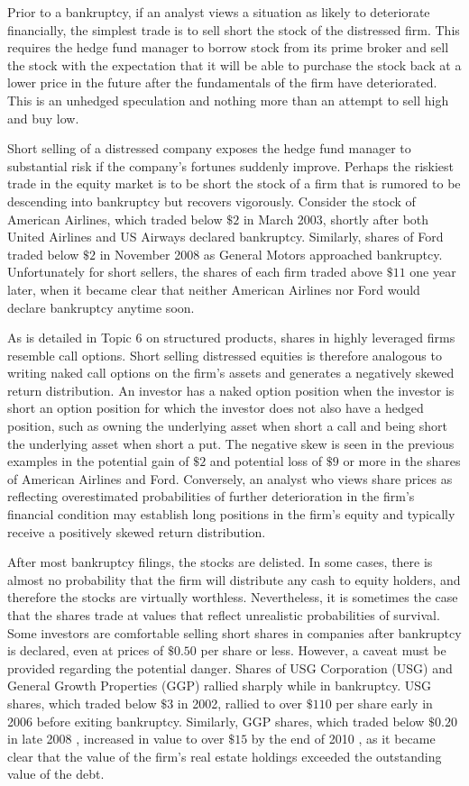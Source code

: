 \documentclass[11pt]{article}
\begin{document}
Prior to a bankruptcy, if an analyst views a situation as likely to deteriorate financially, the simplest trade is to sell short the stock of the distressed firm. This requires the hedge fund manager to borrow stock from its prime broker and sell the stock with the expectation that it will be able to purchase the stock back at a lower price in the future after the fundamentals of the firm have deteriorated. This is an unhedged speculation and nothing more than an attempt to sell high and buy low.

Short selling of a distressed company exposes the hedge fund manager to substantial risk if the company's fortunes suddenly improve. Perhaps the riskiest trade in the equity market is to be short the stock of a firm that is rumored to be descending into bankruptcy but recovers vigorously. Consider the stock of American Airlines, which traded below $\$ 2$ in March 2003, shortly after both United Airlines and US Airways declared bankruptcy. Similarly, shares of Ford traded below $\$ 2$ in November 2008 as General Motors approached bankruptcy. Unfortunately for short sellers, the shares of each firm traded above $\$ 11$ one year later, when it became clear that neither American Airlines nor Ford would declare bankruptcy anytime soon.

As is detailed in Topic 6 on structured products, shares in highly leveraged firms resemble call options. Short selling distressed equities is therefore analogous to writing naked call options on the firm's assets and generates a negatively skewed return distribution. An investor has a naked option position when the investor is short an option position for which the investor does not also have a hedged position, such as owning the underlying asset when short a call and being short the underlying asset when short a put. The negative skew is seen in the previous examples in the potential gain of $\$ 2$ and potential loss of $\$ 9$ or more in the shares of American Airlines and Ford. Conversely, an analyst who views share prices as reflecting overestimated probabilities of further deterioration in the firm's financial condition may establish long positions in the firm's equity and typically receive a positively skewed return distribution.

After most bankruptcy filings, the stocks are delisted. In some cases, there is almost no probability that the firm will distribute any cash to equity holders, and therefore the stocks are virtually worthless. Nevertheless, it is sometimes the case that the shares trade at values that reflect unrealistic probabilities of survival. Some investors are comfortable selling short shares in companies after bankruptcy is declared, even at prices of $\$ 0.50$ per share or less. However, a caveat must be provided regarding the potential danger. Shares of USG Corporation (USG) and General Growth Properties (GGP) rallied sharply while in bankruptcy. USG shares, which traded below $\$ 3$ in 2002, rallied to over $\$ 110$ per share early in 2006 before exiting bankruptcy. Similarly, GGP shares, which traded below $\$ 0.20$ in late 2008 , increased in value to over $\$ 15$ by the end of 2010 , as it became clear that the value of the firm's real estate holdings exceeded the outstanding value of the debt.
\end{document}
